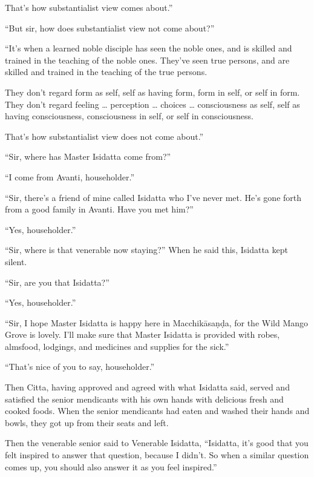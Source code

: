 \documentclass[12pt,openany]{book}%
\begin{document}
That’s how substantialist view comes about.” 

“But sir, how does substantialist view not come about?” 

“It’s when a learned noble disciple has seen the noble ones, and is skilled and trained in the teaching of the noble ones. They’ve seen true persons, and are skilled and trained in the teaching of the true persons. 

They don’t regard form as self, self as having form, form in self, or self in form. They don’t regard feeling … perception … choices … consciousness as self, self as having consciousness, consciousness in self, or self in consciousness. 

That’s how substantialist view does not come about.” 

“Sir, where has Master Isidatta come from?” 

“I come from Avanti, householder.” 

“Sir, there’s a friend of mine called Isidatta who I’ve never met. He’s gone forth from a good family in Avanti. Have you met him?” 

“Yes, householder.” 

“Sir, where is that venerable now staying?” When he said this, Isidatta kept silent. 

“Sir, are you that Isidatta?” 

“Yes, householder.” 

“Sir, I hope Master Isidatta is happy here in \textsanskrit{Macchikāsaṇḍa}, for the Wild Mango Grove is lovely. I’ll make sure that Master Isidatta is provided with robes, almsfood, lodgings, and medicines and supplies for the sick.” 

“That’s nice of you to say, householder.” 

Then Citta, having approved and agreed with what Isidatta said, served and satisfied the senior mendicants with his own hands with delicious fresh and cooked foods. When the senior mendicants had eaten and washed their hands and bowls, they got up from their seats and left. 

Then the venerable senior said to Venerable Isidatta, “Isidatta, it’s good that you felt inspired to answer that question, because I didn’t. So when a similar question comes up, you should also answer it as you feel inspired.” 
\end{document}
